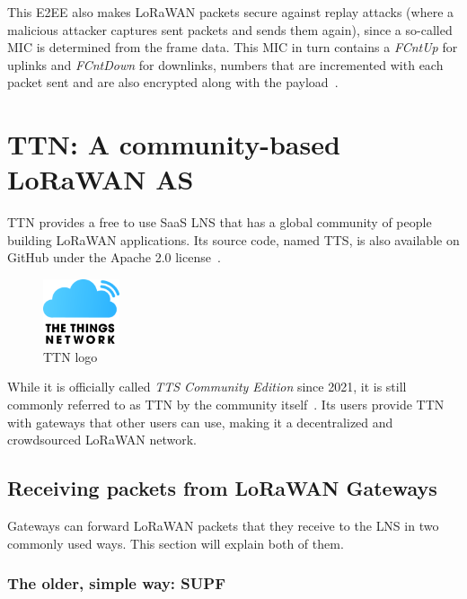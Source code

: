 This \ac{E2EE} also makes \ac{LoRaWAN} packets secure against replay attacks (where a malicious attacker captures sent packets and sends them again), since a so-called \ac{MIC} is determined from the frame data.
This \ac{MIC} in turn contains a \emph{FCntUp} for uplinks and \emph{FCntDown} for downlinks, numbers that are incremented with each packet sent and are also encrypted along with the payload~\cite[p. 22f.]{lora_alliance_inc_lorawan_specification_2017}.

\section{\acl{TTN}: A community-based \ac{LoRaWAN} \acl{AS}}

\ac{TTN} provides a free to use \ac{SaaS} \ac{LNS} that has a global community of people building \ac{LoRaWAN} applications.
Its source code, named \ac{TTS}, is also available on GitHub under the Apache 2.0 license~\cite{the_things_network_thethingsnetworklorawan-stack_2023}.

\begin{figure}[htbp]
    \centering
    \includegraphics[width=0.2\textwidth]{pictures/logos/TTN-logo.eps}
    \caption{\acf{TTN} logo~\protect\cite{the_things_industries_bv_quick_nodate}}
\end{figure}


While it is officially called \emph{\acl{TTS} Community Edition} since 2021, it is still commonly referred to as \acf{TTN} by the community itself~\cite{the_things_industries_bv_what_2022}.
Its users provide \ac{TTN} with gateways that other users can use, making it a decentralized and crowdsourced \ac{LoRaWAN} network.

\subsection{Receiving packets from \acs{LoRaWAN} Gateways}

Gateways can forward \ac{LoRaWAN} packets that they receive to the \ac{LNS} in two commonly used ways.
This section will explain both of them.

\subsubsection{The older, simple way: \acl{SUPF}}

